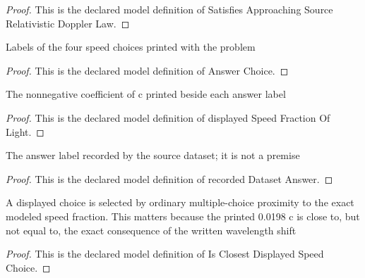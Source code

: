 \begin{proof}
  This is the declared model definition of Satisfies Approaching Source Relativistic Doppler Law.
\end{proof}
\begin{definition}
  \label{def:physics:phyx-mini-0567:phyxminiproblems-problemphyxmini0567-answerchoice}
  Labels of the four speed choices printed with the problem
\end{definition}
\begin{proof}
  This is the declared model definition of Answer Choice.
\end{proof}
\begin{definition}
  \label{def:physics:phyx-mini-0567:phyxminiproblems-problemphyxmini0567-displayedspeedfractionoflight}
  The nonnegative coefficient of c printed beside each answer label
\end{definition}
\begin{proof}
  This is the declared model definition of displayed Speed Fraction Of Light.
\end{proof}
\begin{definition}
  \label{def:physics:phyx-mini-0567:phyxminiproblems-problemphyxmini0567-recordeddatasetanswer}
  The answer label recorded by the source dataset; it is not a premise
\end{definition}
\begin{proof}
  This is the declared model definition of recorded Dataset Answer.
\end{proof}
\begin{definition}
  \label{def:physics:phyx-mini-0567:phyxminiproblems-problemphyxmini0567-isclosestdisplayedspeedchoice}
  A displayed choice is selected by ordinary multiple-choice proximity to the exact modeled speed fraction. This matters because the printed 0.0198 c is close to, but not equal to, the exact consequence of the written wavelength shift
\end{definition}
\begin{proof}
  This is the declared model definition of Is Closest Displayed Speed Choice.
\end{proof}
